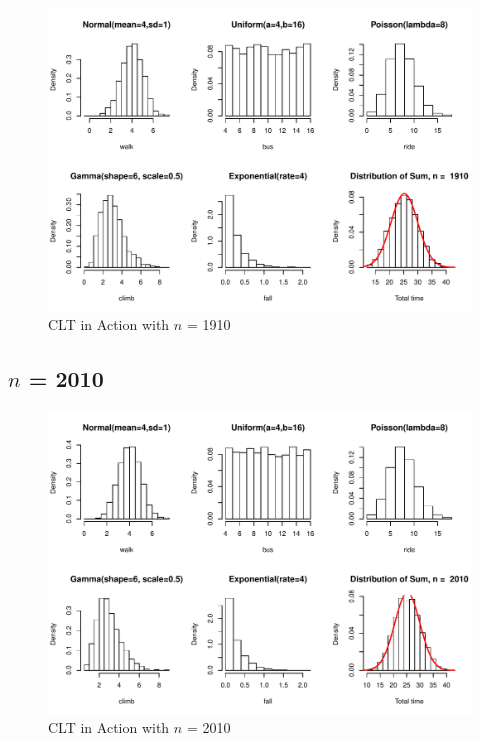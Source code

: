 \documentclass[11pt,letter]{article}\usepackage[]{graphicx}\usepackage[]{color}
\makeatletter
\def\maxwidth{ %
  \ifdim\Gin@nat@width>\linewidth
    \linewidth
  \else
    \Gin@nat@width
  \fi
}
\newenvironment{knitrout}{}{} %
\makeatother
\begin{document}
\begin{knitrout}
\color{fgcolor}\begin{figure}[h]

{\centering \includegraphics[width=\maxwidth]{figure/n-1910-1} 

}

\caption[CLT in Action with ]{CLT in Action with $n$ = 1910}\label{fig:n-1910}
\end{figure}


\end{knitrout}
\newpage
\subsection{$n$ = 2010}

\begin{knitrout}
\color{fgcolor}\begin{figure}[h]

{\centering \includegraphics[width=\maxwidth]{figure/n-2010-1} 

}

\caption[CLT in Action with ]{CLT in Action with $n$ = 2010}\label{fig:n-2010}
\end{figure}


\end{knitrout}
\end{document}

